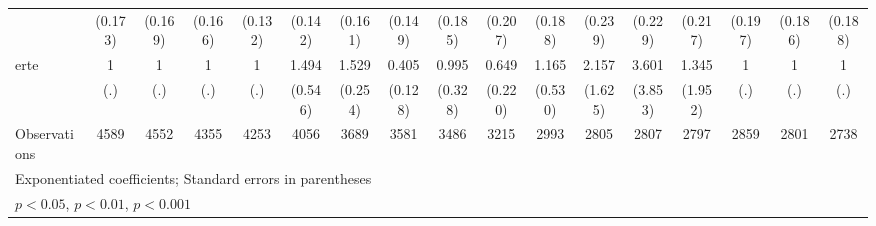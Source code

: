 {\begin{tabular}{l*{16}{c}}
                    &     (0.173)         &     (0.169)         &     (0.166)         &     (0.132)         &     (0.142)         &     (0.161)         &     (0.149)         &     (0.185)         &     (0.207)         &     (0.188)         &     (0.239)         &     (0.229)         &     (0.217)         &     (0.197)         &     (0.186)         &     (0.188)         \\
[1em]
erte                &           1         &           1         &           1         &           1         &       1.494         &       1.529\sym{*}  &       0.405\sym{**} &       0.995         &       0.649         &       1.165         &       2.157         &       3.601         &       1.345         &           1         &           1         &           1         \\
                    &         (.)         &         (.)         &         (.)         &         (.)         &     (0.546)         &     (0.254)         &     (0.128)         &     (0.328)         &     (0.220)         &     (0.530)         &     (1.625)         &     (3.853)         &     (1.952)         &         (.)         &         (.)         &         (.)         \\
\hline
Observations        &        4589         &        4552         &        4355         &        4253         &        4056         &        3689         &        3581         &        3486         &        3215         &        2993         &        2805         &        2807         &        2797         &        2859         &        2801         &        2738         \\
\hline\hline
\multicolumn{17}{l}{\footnotesize Exponentiated coefficients; Standard errors in parentheses}\\
\multicolumn{17}{l}{\footnotesize \sym{*} \(p<0.05\), \sym{**} \(p<0.01\), \sym{***} \(p<0.001\)}\\
\end{tabular}
}
